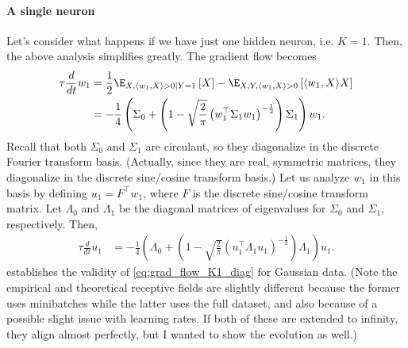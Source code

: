 \documentclass{article}
\begin{document}
\paragraph*{A single neuron}
Let's consider what happens if we have just one hidden neuron, i.e. $K=1$.
Then, the above analysis simplifies greatly.
The gradient flow becomes
\begin{align}
  \tau \frac{d}{dt} w_1
  &= \frac{1}{2} \E_{X, \langle w_1, X \rangle > 0 \mid Y=1} \left[ X \right] - \E_{X,Y, \langle w_1, X \rangle > 0} \left[ \langle w_1, X \rangle X \right] \\
  &= - \frac{1}{4} \left( \Sigma_0 + \left( 1 - \sqrt{\frac{2}{\pi}} \left( w_1^\top \Sigma_1 w_1 \right)^{-\frac{1}{2}} \right) \Sigma_1 \right) w_1.
\end{align}
Recall that both $\Sigma_0$ and $\Sigma_1$ are circulant, so they diagonalize in the discrete Fourier transform basis.
(Actually, since they are real, symmetric matrices, they diagonalize in the discrete sine/cosine transform basis.)
Let us analyze $w_1$ in this basis by defining $u_1 = F^\top w_1$, where $F$ is the discrete sine/cosine transform matrix.
Let $\Lambda_0$ and $\Lambda_1$ be the diagonal matrices of eigenvalues for $\Sigma_0$ and $\Sigma_1$, respectively.
Then,
\begin{align}
  \tau \frac{d}{dt} u_1
  &= - \frac{1}{4} \left( \Lambda_0 + \left( 1 - \sqrt{\frac{2}{\pi}} \left( u_1^\top \Lambda_1 u_1 \right)^{-\frac{1}{2}} \right) \Lambda_1 \right) u_1.
  \label{eq:grad_flow_K1_diag}
\end{align}
 establishes the validity of \cref{eq:grad_flow_K1_diag} for Gaussian data.
(Note the empirical and theoretical receptive fields are slightly different because the former uses minibatches while the latter uses the full dataset, and also because of a possible slight issue with learning rates.
If both of these are extended to infinity, they align almost perfectly, but I wanted to show the evolution as well.)
\end{document}
